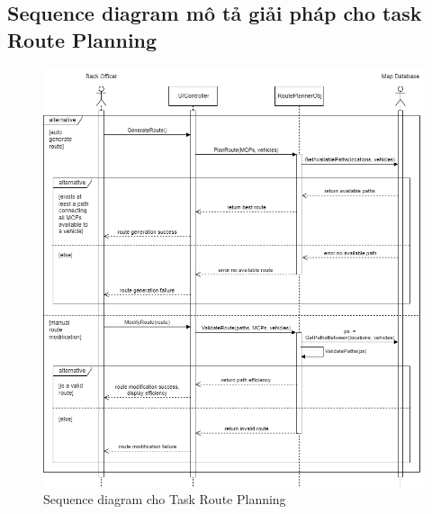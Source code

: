     \subsection{Sequence diagram mô tả giải pháp cho task Route Planning}
        \begin{figure}[H]
            \centering
            \includegraphics[width=1\linewidth]{imgs/sequence diagram/Sequence Diagram 2.2.png}
            \caption{Sequence diagram cho Task Route Planning}
        \end{figure}

        \newpage
